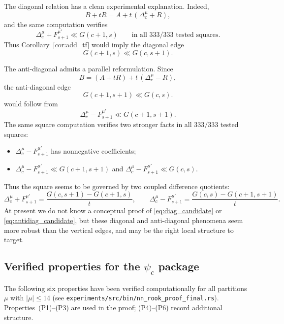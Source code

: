\documentclass[11pt,reqno]{amsart}
\theoremstyle{definition}
\newcommand{\interl}{\ll}
\begin{document}
The diagonal relation has a clean experimental explanation.
Indeed,
\[
  B+tR
  = A + t\,(\Delta_c^\mu + R),
\]
and the same computation verifies
\begin{equation}\label{eq:diag_candidate}
  \Delta_c^\mu + F_{s+1}^{\mu'} \interl G(c+1,s)
  \qquad\text{in all } 333/333 \text{ tested squares.}
\end{equation}
Thus Corollary~\ref{cor:add_tf} would imply the diagonal edge
\[
  G(c+1,s) \interl G(c,s+1).
\]

The anti-diagonal admits a parallel reformulation.
Since
\[
  B
  = (A+tR) + t\,(\Delta_c^\mu - R),
\]
the anti-diagonal edge
\[
  G(c+1,s+1) \interl G(c,s).
\]
would follow from
\begin{equation}\label{eq:antidiag_candidate}
  \Delta_c^\mu - F_{s+1}^{\mu'}
  \interl G(c+1,s+1).
\end{equation}
The same square computation verifies two stronger facts in all
$333/333$ tested squares:
\begin{itemize}
\item $\Delta_c^\mu - F_{s+1}^{\mu'}$ has nonnegative coefficients;
\item $\Delta_c^\mu - F_{s+1}^{\mu'} \interl G(c+1,s+1)$ and
  $\Delta_c^\mu - F_{s+1}^{\mu'} \interl G(c,s)$.
\end{itemize}

Thus the square seems to be governed by two coupled difference quotients:
\[
  \Delta_c^\mu + F_{s+1}^{\mu'}
  = \frac{G(c,s+1)-G(c+1,s)}{t},
  \qquad
  \Delta_c^\mu - F_{s+1}^{\mu'}
  = \frac{G(c,s)-G(c+1,s+1)}{t}.
\]
At present we do not know a conceptual proof of
\eqref{eq:diag_candidate} or \eqref{eq:antidiag_candidate},
but these diagonal and anti-diagonal phenomena seem more robust than the
vertical edges, and may be the right local structure to target.

\subsection{Verified properties for the \texorpdfstring{$\psi_c$}{psi_c} package}\label{sec:properties}

The following six properties have been verified computationally
for all partitions~$\mu$ with $|\mu| \leq 14$
(see \texttt{experiments/src/bin/nn\_rook\_proof\_final.rs}).
Properties~(P1)--(P3) are used in the proof;
(P4)--(P6) record additional structure.
\end{document}
